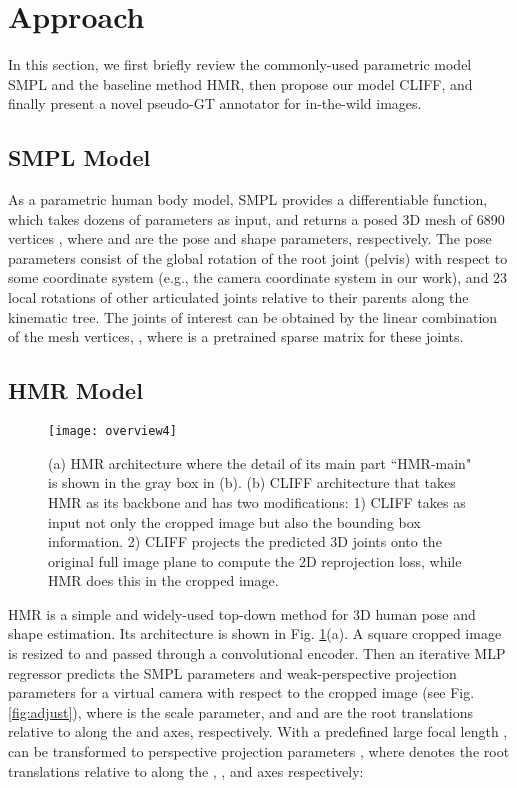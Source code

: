 \documentclass[runningheads]{llncs}
\begin{document}
\section{Approach}\label{sec:approach}

In this section, we first briefly review the commonly-used parametric model SMPL and the baseline method HMR, then propose our model CLIFF, and finally present a novel pseudo-GT annotator for in-the-wild images.

\subsection{SMPL Model}
As a parametric human body model, SMPL \cite{loper2015smpl} provides a differentiable function, which takes dozens of parameters  as input, and returns a posed 3D mesh of 6890 vertices , where  and  are the pose and shape parameters, respectively.
The pose parameters  consist of the global rotation of the root joint (pelvis) with respect to some coordinate system (e.g., the camera coordinate system in our work), and 23 local rotations of other articulated joints relative to their parents along the kinematic tree.
The  joints of interest  can be obtained by the linear combination of the mesh vertices, , where  is a pretrained sparse matrix for these  joints.

\subsection{HMR Model}

\begin{figure}[t]
	\centering
	\texttt{[image: overview4]}
	\caption {(a) HMR architecture where the detail of its main part ``HMR-main" is shown in the gray box in (b). (b) CLIFF architecture that takes HMR as its backbone and has two modifications: 1) CLIFF takes as input not only the cropped image but also the bounding box information. 2) CLIFF projects the predicted 3D joints onto the original full image plane to compute the 2D reprojection loss, while HMR does this in the cropped image.}
	\label{fig:overview}
\end{figure}



HMR \cite{kanazawa2018end} is a simple and widely-used top-down method for 3D human pose and shape estimation.
Its architecture is shown in Fig. \ref{fig:overview}(a).
A square cropped image is resized to  and passed through a convolutional encoder.
Then an iterative MLP regressor predicts the SMPL parameters  and weak-perspective projection parameters  for a virtual camera  with respect to the cropped image (see Fig. \ref{fig:adjust}), where  is the scale parameter, and  and  are the root translations relative to  along the  and  axes, respectively.
With a predefined large focal length ,  can be transformed to perspective projection parameters , where  denotes the root translations relative to  along the , , and  axes respectively:
\end{document}
